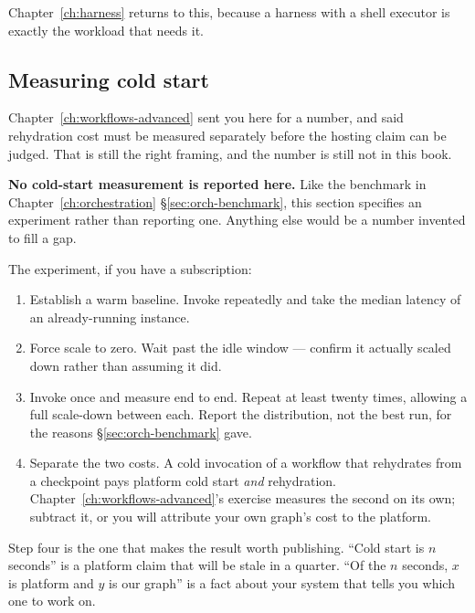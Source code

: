 Chapter~\ref{ch:harness} returns to this, because a harness with a shell executor
is exactly the workload that needs it.

\subsection{Measuring cold start}
\label{sec:host-coldstart}

Chapter~\ref{ch:workflows-advanced} sent you here for a number, and said
rehydration cost must be measured separately before the hosting claim can be
judged. That is still the right framing, and the number is still not in this
book.

\begin{warning}
\textbf{No cold-start measurement is reported here.} Like the benchmark in
Chapter~\ref{ch:orchestration} \S\ref{sec:orch-benchmark}, this section specifies
an experiment rather than reporting one. Anything else would be a number invented
to fill a gap.
\end{warning}

The experiment, if you have a subscription:

\begin{enumerate}[leftmargin=1.4em]
\item Establish a warm baseline. Invoke repeatedly and take the median latency of
      an already-running instance.
\item Force scale to zero. Wait past the idle window --- confirm it actually
      scaled down rather than assuming it did.
\item Invoke once and measure end to end. Repeat at least twenty times, allowing
      a full scale-down between each. Report the distribution, not the best run,
      for the reasons \S\ref{sec:orch-benchmark} gave.
\item Separate the two costs. A cold invocation of a workflow that rehydrates
      from a checkpoint pays platform cold start \emph{and} rehydration.
      Chapter~\ref{ch:workflows-advanced}'s exercise measures the second on its
      own; subtract it, or you will attribute your own graph's cost to the
      platform.
\end{enumerate}

Step four is the one that makes the result worth publishing. ``Cold start is $n$
seconds'' is a platform claim that will be stale in a quarter. ``Of the $n$
seconds, $x$ is platform and $y$ is our graph'' is a fact about your system that
tells you which one to work on.

